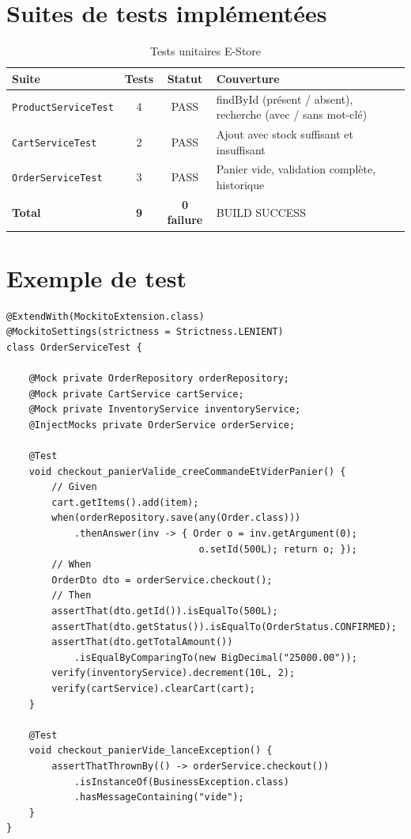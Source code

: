 \documentclass[11pt,a4paper,oneside]{report}
\begin{document}
\section{Suites de tests implémentées}

\begin{table}[htbp]
\centering
\caption{Tests unitaires E-Store}
\label{tab:tests}
\small
\begin{tabularx}{\textwidth}{lccX}
\toprule
\textbf{Suite} & \textbf{Tests} & \textbf{Statut} & \textbf{Couverture}\\
\midrule
\texttt{ProductServiceTest} & 4 & PASS & findById (présent / absent), recherche (avec / sans mot-clé)\\
\texttt{CartServiceTest}    & 2 & PASS & Ajout avec stock suffisant et insuffisant\\
\texttt{OrderServiceTest}   & 3 & PASS & Panier vide, validation complète, historique\\
\midrule
\textbf{Total}              & \textbf{9} & \textbf{0 failure} & BUILD SUCCESS\\
\bottomrule
\end{tabularx}
\end{table}

\section{Exemple de test}

\begin{lstlisting}[style=javastyle, caption=Test du checkout transactionnel]
@ExtendWith(MockitoExtension.class)
@MockitoSettings(strictness = Strictness.LENIENT)
class OrderServiceTest {

    @Mock private OrderRepository orderRepository;
    @Mock private CartService cartService;
    @Mock private InventoryService inventoryService;
    @InjectMocks private OrderService orderService;

    @Test
    void checkout_panierValide_creeCommandeEtViderPanier() {
        // Given
        cart.getItems().add(item);
        when(orderRepository.save(any(Order.class)))
            .thenAnswer(inv -> { Order o = inv.getArgument(0);
                                  o.setId(500L); return o; });
        // When
        OrderDto dto = orderService.checkout();
        // Then
        assertThat(dto.getId()).isEqualTo(500L);
        assertThat(dto.getStatus()).isEqualTo(OrderStatus.CONFIRMED);
        assertThat(dto.getTotalAmount())
            .isEqualByComparingTo(new BigDecimal("25000.00"));
        verify(inventoryService).decrement(10L, 2);
        verify(cartService).clearCart(cart);
    }

    @Test
    void checkout_panierVide_lanceException() {
        assertThatThrownBy(() -> orderService.checkout())
            .isInstanceOf(BusinessException.class)
            .hasMessageContaining("vide");
    }
}
\end{lstlisting}
\end{document}
